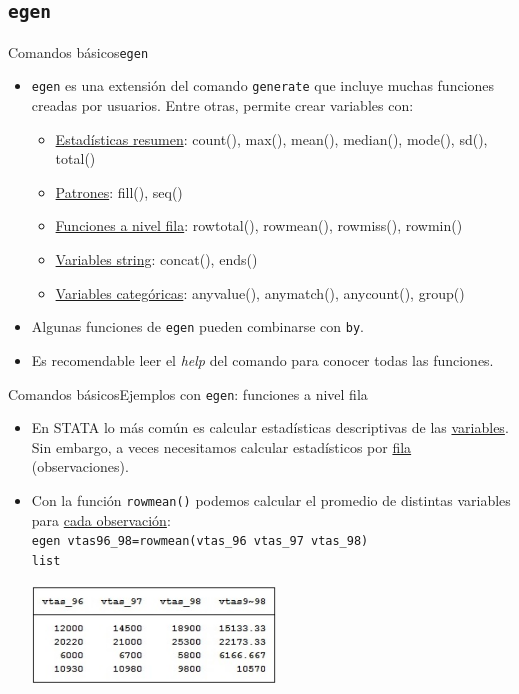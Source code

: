 \documentclass{beamer}
\begin{document}
\subsection{\texttt{egen}}
\begin{frame}{Comandos básicos}{\texttt{egen}}
\begin{itemize}
\item \texttt{egen} es una extensión del comando \texttt{generate} que incluye muchas funciones creadas por usuarios. Entre otras, permite crear variables con:
\begin{itemize}
\item \underline{Estadísticas resumen}: count(), max(), mean(), median(), mode(), sd(), total()
\item \underline{Patrones}: fill(), seq()
\item \underline{Funciones a nivel fila}: rowtotal(), rowmean(), rowmiss(), rowmin()
\item \underline{Variables string}: concat(), ends()
\item \underline{Variables categóricas}: anyvalue(), anymatch(), anycount(), group()
\end{itemize}
\item Algunas funciones de \texttt{egen} pueden combinarse con \texttt{by}.
\item Es recomendable leer el \textit{help} del comando para conocer todas las funciones.
\end{itemize}
\end{frame}

\begin{frame}{Comandos básicos}{Ejemplos con \texttt{egen}: funciones a nivel fila}
\begin{itemize}
\item En STATA lo más común es calcular estadísticas descriptivas de las \underline{variables}. Sin embargo, a veces necesitamos calcular estadísticos por \underline{fila} (observaciones). 
\item Con la función \texttt{rowmean()} podemos calcular el promedio de distintas variables para \underline{cada observación}: \\
{\footnotesize \texttt{egen vtas96\_98=rowmean(vtas\_96 vtas\_97  vtas\_98)}}\\
{\footnotesize \texttt{list}}\\\medskip
\centerline{\includegraphics[height=2.7cm]{egen2.jpg}}
\end{itemize}
\end{frame}
\end{document}
